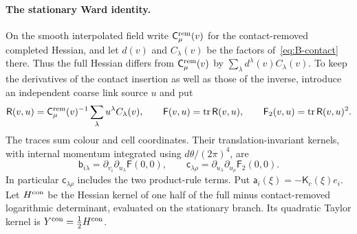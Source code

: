 \paragraph{The stationary Ward identity.} On the smooth interpolated field write $\mathsf C^{\rm rem}_\mu(v)$ for the contact-removed completed Hessian, and let $d(v)$ and $C_\lambda(v)$ be the factors of~\eqref{eq:B-contact} there. Thus the full Hessian differs from $\mathsf C^{\rm rem}_\mu(v)$ by $\sum_\lambda d^\lambda(v)C_\lambda(v)$. To keep the derivatives of the contact insertion as well as those of the inverse, introduce an independent coarse link source $u$ and put
\begin{equation*}
\mathsf R(v,u)=\mathsf C^{\rm rem}_\mu(v)^{-1}\sum_\lambda u^\lambda C_\lambda(v),\qquad
\mathsf F(v,u)=\operatorname{tr}\mathsf R(v,u),\qquad
\mathsf F_2(v,u)=\operatorname{tr}\mathsf R(v,u)^2.
\end{equation*}
The traces sum colour and cell coordinates. Their translation-invariant kernels, with internal momentum integrated using $d\theta/(2\pi)^4$, are
\begin{equation*}
\mathsf b_{i\lambda}=\partial_{v_i}\partial_{u_\lambda}\mathsf F(0,0),\qquad
\mathsf c_{\lambda\rho}=\partial_{u_\lambda}\partial_{u_\rho}\mathsf F_2(0,0).
\end{equation*}
In particular $\mathsf c_{\lambda\rho}$ includes the two product-rule terms. Put $\mathsf a_i(\xi)=-\mathsf K_c(\xi)e_i$. Let $H^{\rm con}$ be the Hessian kernel of one half of the full minus contact-removed logarithmic determinant, evaluated on the stationary branch. Its quadratic Taylor kernel is $Y^{\rm con}=\tfrac12H^{\rm con}$.

